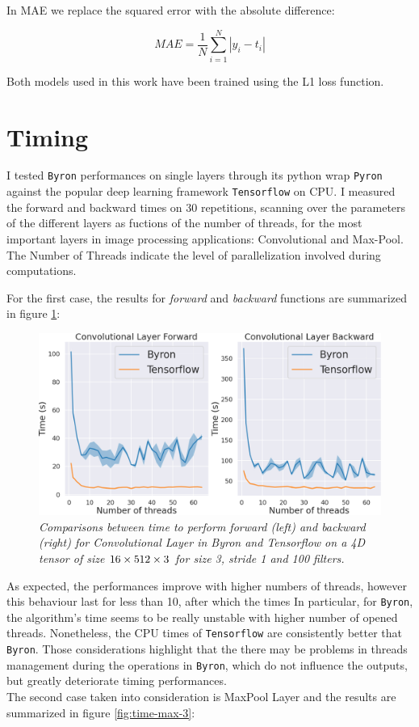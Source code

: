 \documentclass[12pt,a4paper]{report}
\begin{document}
In MAE we replace the squared error with the absolute difference:

\begin{equation}
 MAE = \frac{1}{N} \sum_{i=1}^{N} |y_i - t_i|
\end{equation}

Both models used in this work have been trained using the L1 loss function. 


\section{Timing}

I tested {\tt Byron} performances on single layers through its python wrap {\tt Pyron} against the popular deep learning framework {\tt Tensorflow} on CPU.
I measured the forward and backward times on 30 repetitions, scanning over the parameters of the different layers as fuctions of the number of threads, for the most important layers in image processing applications: Convolutional and Max-Pool.
The Number of Threads indicate the level of parallelization involved during computations.

For the first case, the results for {\it forward} and {\it backward} functions are summarized in figure \ref{fig:time-conv}:

\begin{figure}[H]
\centering
\includegraphics[scale=0.3]{./images/convolutional_timing.png}
\caption{\it Comparisons between time to perform forward (left) and backward (right) for Convolutional Layer in Byron and Tensorflow on a 4D tensor of size $16 \time 512 \times 512 \times 3$ for size 3, stride 1 and 100 filters.}
\label{fig:time-conv}
\end{figure}

As expected, the performances improve with higher numbers of threads, however this behaviour last for less than 10, after which the times 
In particular, for {\tt Byron}, the algorithm's time seems to be really unstable with higher number of opened threads. 
Nonetheless, the CPU times of {\tt Tensorflow} are consistently better that {\tt Byron}.
Those considerations highlight that the there may be problems in threads management during the operations in {\tt Byron}, which do not influence the outputs, but greatly deteriorate timing performances.
\\
The second case taken into consideration is MaxPool Layer and the results are summarized in figure \ref{fig:time-max-3}:
\end{document}
